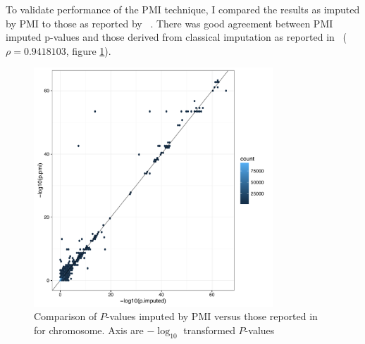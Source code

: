 \documentclass[a4paper,11pt]{report}
\begin{document}
To validate performance of the PMI technique, I compared the results as imputed by PMI to those as reported by  ~\citep{Okada2014-um}. There was good agreement between PMI imputed p-values and those derived from classical imputation as reported in~\citet{Okada2014-um} ($\rho=0.9418103$, figure \ref{fig:pmi_comparison}). %

\begin{figure}[h]
\centering
\includegraphics[width=0.8\textwidth]{pmi_vs_imp.pdf}
\caption{Comparison of $P$-values imputed by PMI versus those reported in ~\citep{Okada2014-um} for chromosome. Axis are $-\log_{10}$ transformed $P$-values}
\label{fig:pmi_comparison}
\end{figure}

\end{document}
